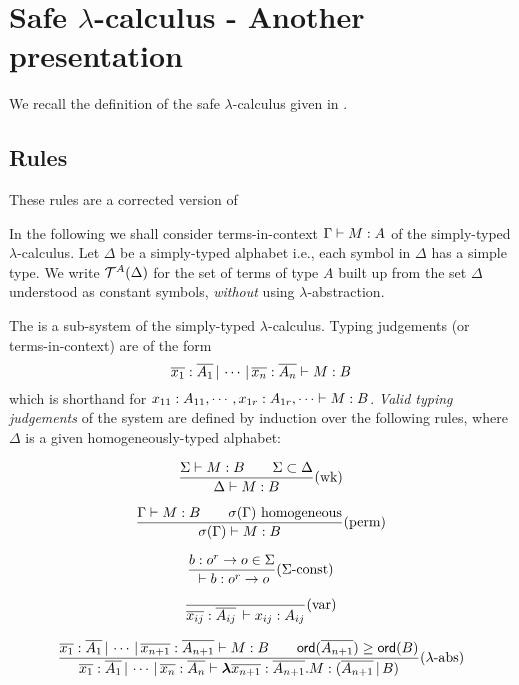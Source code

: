\section{Safe $\lambda$-calculus - Another presentation}
\label{sec:safe_alt}

We recall the definition of the safe $\lambda$-calculus given in
\cite{Ong2005}.

\subsection{ Rules}

These rules are a corrected version of
\cite{DBLP:conf/fossacs/AehligMO05}

In the following we shall consider terms-in-context ${{\Gamma} \vdash {M
: A}}$ of the simply-typed $\lambda$-calculus. Let $\Delta$ be a
simply-typed alphabet i.e., each symbol in $\Delta$ has a simple
type. We write ${\cal T}^{A}(\Delta)$ for the set of terms of type $A$
built up from the set $\Delta$ understood as constant symbols,
\emph{without} using $\lambda$-abstraction.


The  is a sub-system of the
simply-typed $\lambda$-calculus. Typing judgements (or
terms-in-context) are of the form
\begin{equation}
\nonumber {{\overline{x_1}:\overline{A_1} \, | \, \cdots \, | \,
\overline{x_n} :  \overline{A_n}} \vdash {M : B}}
\end{equation}
which is shorthand for ${{x_{11} : A_{11}, \cdots, x_{1r}:
A_{1r}, \cdots} \vdash {M : B}}$. \emph{Valid typing judgements} of the
system are defined by induction over the following rules, where
$\Delta$ is a given homogeneously-typed alphabet:

\[ {    { {{\Sigma} \vdash {M:B}} \qquad {\Sigma \subset \Delta} }
    \over
        { {{\Delta } \vdash {M : B}}}
   }
   (\mbox{wk})
\]

\[  {
      { {{\Gamma} \vdash {M:B}} \qquad \sigma(\Gamma) \hbox{ homogeneous} }
    \over
      { {{\sigma(\Gamma)} \vdash {M : B}} }
    }
    (\mbox{perm})
\]


\[{ {b : o^r \rightarrow o \in \Sigma } \over {{{} \vdash {b : o^r \rightarrow o}}}}  (\Sigma\mbox{-const})  \]

\[{ \over
{{{\overline{x_{ij}} : \overline{A_{ij}}\, } \vdash {x_{ij} :
A_{ij}}}}}(\mbox{var})\]

\[
{ {{{\overline{x_1} : \overline{A_1}\, | \, \cdots\, | \,
\overline{x_{n+1}} : \overline{A_{n+1}}} \vdash {M : B}}} \qquad
{\sf ord}(\overline{A_{n+1}}) \geq {\sf ord}(B) \over {{{\overline{x_1} :
\overline{A_1}\, | \, \cdots\, | \, \overline{x_{n}} :
\overline{A_{n}}} \vdash {{\hbox{\boldmath $\lambda$}{\overline{x_{n+1}} : \overline{A_{n+1}}}.{M}}
: (\overline{A_{n+1}} \, | \, B)}}} } (\mbox{$\lambda$-abs})\]

